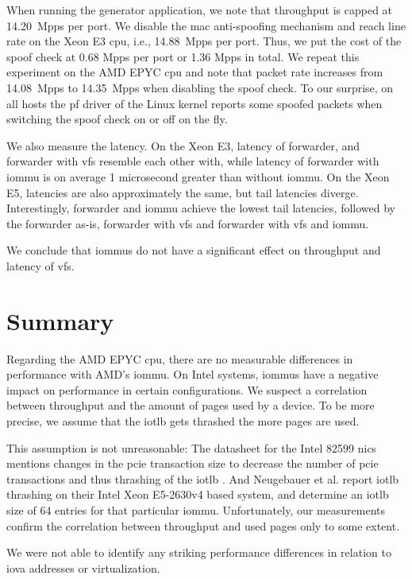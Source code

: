 When running the generator application, we note that throughput is capped at
14.20~Mpps per port. We disable the \ac{mac} anti-spoofing mechanism and reach
line rate on the Xeon E3 \ac{cpu}, i.e., 14.88~Mpps per port. Thus, we put the
cost of the spoof check at 0.68 Mpps per port or 1.36 Mpps in total. We repeat
this experiment on the AMD EPYC \ac{cpu} and note that packet rate increases
from 14.08~Mpps to 14.35~Mpps when disabling the spoof check. To our surprise,
on all hosts the \ac{pf} driver of the Linux kernel reports some spoofed packets
when switching the spoof check on or off on the fly.

We also measure the latency. On the Xeon E3, latency of forwarder, and forwarder
with \acp{vf} resemble each other with, while latency of forwarder with
\ac{iommu} is on average 1 microsecond greater than without \ac{iommu}. On the
Xeon E5, latencies are also approximately the same, but tail latencies diverge.
Interestingly, forwarder and \ac{iommu} achieve the lowest tail latencies,
followed by the forwarder as-is, forwarder with \acp{vf} and forwarder with
\acp{vf} and \ac{iommu}.

We conclude that \acp{iommu} do not have a significant effect on throughput and
latency of \acp{vf}.


\section{Summary}
\label{sec:perf_summary}

Regarding the AMD EPYC \ac{cpu}, there are no measurable differences in
performance with AMD's \ac{iommu}. On Intel systems, \acp{iommu} have a negative
impact on performance in certain configurations. We suspect a correlation
between throughput and the amount of pages used by a device. To be more precise,
we assume that the \ac{iotlb} gets thrashed the more pages are used.

This assumption is not unreasonable: The datasheet for the Intel 82599 \acp{nic}
mentions changes in the \ac{pcie} transaction size to decrease the number of
\ac{pcie} transactions and thus thrashing of the \ac{iotlb}
\cite[p.~34]{intel2019datasheet}. And Neugebauer et al.
\cite{neugebauer2018understanding} report \ac{iotlb} thrashing on their Intel
Xeon E5-2630v4 based system, and determine an \ac{iotlb} size of 64 entries for
that particular \ac{iommu}. Unfortunately, our measurements confirm the
correlation between throughput and used pages only to some extent.

We were not able to identify any striking performance differences in relation to
\ac{iova} addresses or virtualization.


